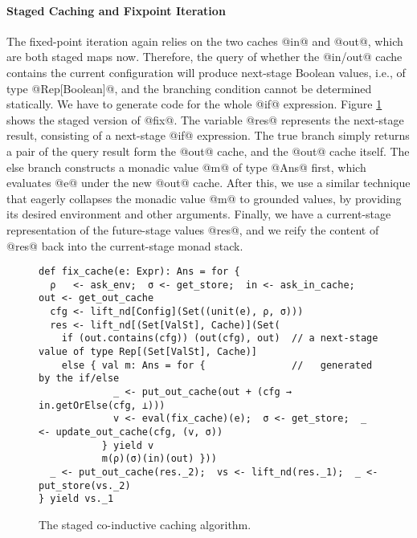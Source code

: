 \paragraph{Staged Caching and Fixpoint Iteration} The fixed-point iteration
again relies on the two caches @in@ and @out@, which are both staged maps now.
Therefore, the query of whether the @in/out@ cache contains the current
configuration will produce next-stage Boolean values, i.e., of type
@Rep[Boolean]@, and the branching condition cannot be determined statically.
We have to generate code for the whole @if@ expression.
Figure \ref{fig:staged_coind_cache} shows the staged version of @fix@. The
variable @res@ represents the next-stage result, consisting of a next-stage
@if@ expression. The true branch simply returns a pair of the query result
form the @out@ cache, and the @out@ cache itself. The else branch constructs a
monadic value @m@ of type @Ans@ first, which evaluates @e@ under the new @out@
cache.  After this, we use a similar technique that eagerly collapses the
monadic value @m@ to grounded values, by providing its desired environment and
other arguments.  Finally, we have a current-stage representation of the
future-stage values @res@, and we reify the content of @res@ back into the
current-stage monad stack.

\begin{figure}[t]
\centering
\begin{lstlisting}
def fix_cache(e: Expr): Ans = for {
  ρ   <- ask_env;  σ <- get_store;  in <- ask_in_cache;  out <- get_out_cache
  cfg <- lift_nd[Config](Set((unit(e), ρ, σ)))
  res <- lift_nd[(Set[ValSt], Cache)](Set(
    if (out.contains(cfg)) (out(cfg), out)  // a next-stage value of type Rep[(Set[ValSt], Cache)]
    else { val m: Ans = for {               //   generated by the if/else
             _ <- put_out_cache(out + (cfg → in.getOrElse(cfg, ⊥)))
             v <- eval(fix_cache)(e);  σ <- get_store;  _ <- update_out_cache(cfg, (v, σ))
           } yield v
           m(ρ)(σ)(in)(out) }))
  _ <- put_out_cache(res._2);  vs <- lift_nd(res._1);  _ <- put_store(vs._2)
} yield vs._1
\end{lstlisting}
\vspace{-1em}
\caption{The staged co-inductive caching algorithm.} \label{fig:staged_coind_cache}
\vspace{-1.5em}
\end{figure}

